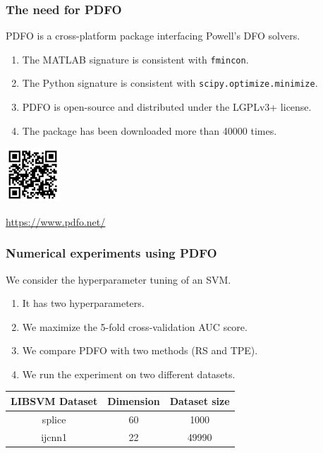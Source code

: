 \documentclass{polyu-presentation}
\begin{document}
\begin{frame}
    \frametitle{The need for PDFO}

    \begin{block}{}
        \alert{PDFO} is a \alert{cross-platform} package interfacing Powell's DFO solvers.
    \end{block}

    \medskip

    \begin{enumerate}
        \item The \alert{MATLAB} signature is consistent with \texttt{fmincon}.
        \item The \alert{Python} signature is consistent with \texttt{scipy.optimize.minimize}.
        \item PDFO is \alert{open-source} and distributed under the LGPLv3+ license.
        \item The package has been downloaded more than \alert{\num{40000} times}.
    \end{enumerate}

    \medskip
    
	\begin{center}
        \href{https://www.pdfo.net/}{\includegraphics[width=0.8in]{images/qr/pdfo.png}}

        \scriptsize\url{https://www.pdfo.net/}
    \end{center}
\end{frame}

\begin{frame}
    \frametitle{Numerical experiments using PDFO}

    We consider the \alert{hyperparameter tuning} of an SVM.
    \begin{enumerate}
        \item It has two hyperparameters.
        \item We maximize the \num{5}-fold cross-validation \alert{AUC score}.
        \item We compare PDFO with two methods (RS and TPE).
        \item We run the experiment on two different datasets.
    \end{enumerate}

    \medskip

    \begin{center}
        \begin{tabular}{@{}cS[table-format=2]S[table-format=5]@{}}
            \toprule
            LIBSVM Dataset  & {Dimension}   & {Dataset size}\\
            \midrule
            splice          & 60            & 1000\\
            ijcnn1          & 22            & 49990\\
            \bottomrule
        \end{tabular}
    \end{center}
\end{frame}
\end{document}

